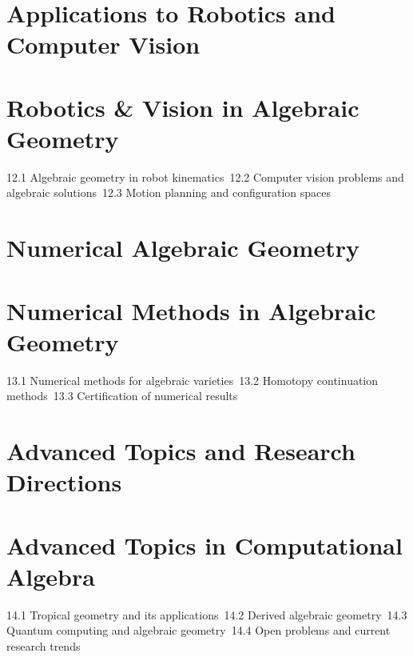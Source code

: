 \section{Applications to Robotics and Computer Vision}
\section{Robotics \& Vision in Algebraic Geometry}
12.1 Algebraic geometry in robot kinematics\
12.2 Computer vision problems and algebraic solutions\
12.3 Motion planning and configuration spaces\
\section{Numerical Algebraic Geometry}
\section{Numerical Methods in Algebraic Geometry}
13.1 Numerical methods for algebraic varieties\
13.2 Homotopy continuation methods\
13.3 Certification of numerical results\
\section{Advanced Topics and Research Directions}
\section{Advanced Topics in Computational Algebra}
14.1 Tropical geometry and its applications\
14.2 Derived algebraic geometry\
14.3 Quantum computing and algebraic geometry\
14.4 Open problems and current research trends\
